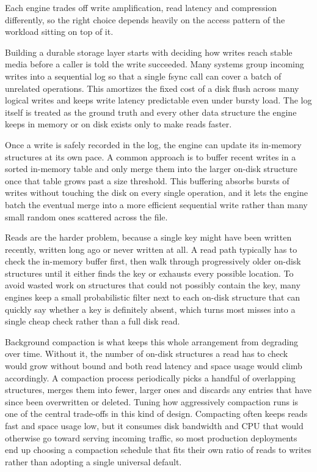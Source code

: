 \documentclass[11pt,letterpaper]{article}
\begin{document}
Each engine trades off write amplification, read latency and compression differently, so the right choice depends heavily on the access pattern of the workload sitting on top of it.

\newpage


Building a durable storage layer starts with deciding how writes reach stable media before a caller is told the write succeeded.
Many systems group incoming writes into a sequential log so that a single fsync call can cover a batch of unrelated operations.
This amortizes the fixed cost of a disk flush across many logical writes and keeps write latency predictable even under bursty load.
The log itself is treated as the ground truth and every other data structure the engine keeps in memory or on disk exists only to make reads faster.

Once a write is safely recorded in the log, the engine can update its in-memory structures at its own pace.
A common approach is to buffer recent writes in a sorted in-memory table and only merge them into the larger on-disk structure once that table grows past a size threshold.
This buffering absorbs bursts of writes without touching the disk on every single operation, and it lets the engine batch the eventual merge into a more efficient sequential write rather than many small random ones scattered across the file.

Reads are the harder problem, because a single key might have been written recently, written long ago or never written at all.
A read path typically has to check the in-memory buffer first, then walk through progressively older on-disk structures until it either finds the key or exhausts every possible location.
To avoid wasted work on structures that could not possibly contain the key, many engines keep a small probabilistic filter next to each on-disk structure that can quickly say whether a key is definitely absent, which turns most misses into a single cheap check rather than a full disk read.

Background compaction is what keeps this whole arrangement from degrading over time.
Without it, the number of on-disk structures a read has to check would grow without bound and both read latency and space usage would climb accordingly.
A compaction process periodically picks a handful of overlapping structures, merges them into fewer, larger ones and discards any entries that have since been overwritten or deleted.
Tuning how aggressively compaction runs is one of the central trade-offs in this kind of design.
Compacting often keeps reads fast and space usage low, but it consumes disk bandwidth and CPU that would otherwise go toward serving incoming traffic, so most production deployments end up choosing a compaction schedule that fits their own ratio of reads to writes rather than adopting a single universal default.
\end{document}
